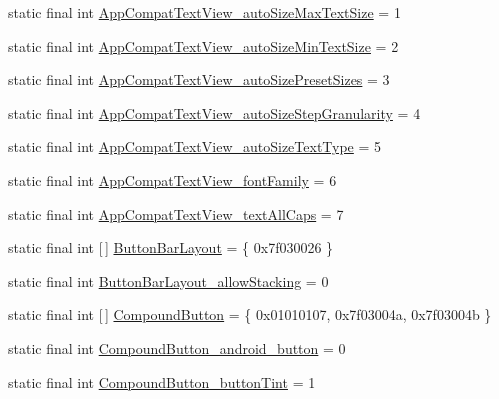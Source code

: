 \begin{DoxyCompactItemize}
\item 
static final int \mbox{\hyperlink{classcom_1_1google_1_1android_1_1gms_1_1R_1_1styleable_a18e47593a99285e77ee036e209ad4318}{App\+Compat\+Text\+View\+\_\+auto\+Size\+Max\+Text\+Size}} = 1
\item 
static final int \mbox{\hyperlink{classcom_1_1google_1_1android_1_1gms_1_1R_1_1styleable_aa47506d4b30e933210d368d9360a3c96}{App\+Compat\+Text\+View\+\_\+auto\+Size\+Min\+Text\+Size}} = 2
\item 
static final int \mbox{\hyperlink{classcom_1_1google_1_1android_1_1gms_1_1R_1_1styleable_afaff39e25514d872c2eeac7c6d953091}{App\+Compat\+Text\+View\+\_\+auto\+Size\+Preset\+Sizes}} = 3
\item 
static final int \mbox{\hyperlink{classcom_1_1google_1_1android_1_1gms_1_1R_1_1styleable_a12f3f949e246ab71c0cc78364946bb54}{App\+Compat\+Text\+View\+\_\+auto\+Size\+Step\+Granularity}} = 4
\item 
static final int \mbox{\hyperlink{classcom_1_1google_1_1android_1_1gms_1_1R_1_1styleable_a61dc26b3a032c9c806e5f683984e7955}{App\+Compat\+Text\+View\+\_\+auto\+Size\+Text\+Type}} = 5
\item 
static final int \mbox{\hyperlink{classcom_1_1google_1_1android_1_1gms_1_1R_1_1styleable_a06b56352a2e7071ed543c96904698b7c}{App\+Compat\+Text\+View\+\_\+font\+Family}} = 6
\item 
static final int \mbox{\hyperlink{classcom_1_1google_1_1android_1_1gms_1_1R_1_1styleable_a037708566032169b1bcab1412a66b4d2}{App\+Compat\+Text\+View\+\_\+text\+All\+Caps}} = 7
\item 
static final int \mbox{[}$\,$\mbox{]} \mbox{\hyperlink{classcom_1_1google_1_1android_1_1gms_1_1R_1_1styleable_a650b866397430655c4e09a4770bd71eb}{Button\+Bar\+Layout}} = \{ 0x7f030026 \}
\item 
static final int \mbox{\hyperlink{classcom_1_1google_1_1android_1_1gms_1_1R_1_1styleable_ad3442de6d8d64995e66c8e56f245d498}{Button\+Bar\+Layout\+\_\+allow\+Stacking}} = 0
\item 
static final int \mbox{[}$\,$\mbox{]} \mbox{\hyperlink{classcom_1_1google_1_1android_1_1gms_1_1R_1_1styleable_a384aa68f632e0b445b573d4fd74f849f}{Compound\+Button}} = \{ 0x01010107, 0x7f03004a, 0x7f03004b \}
\item 
static final int \mbox{\hyperlink{classcom_1_1google_1_1android_1_1gms_1_1R_1_1styleable_ac7709e57c59c14d4b0b12fe7dc3701f3}{Compound\+Button\+\_\+android\+\_\+button}} = 0
\item 
static final int \mbox{\hyperlink{classcom_1_1google_1_1android_1_1gms_1_1R_1_1styleable_a4194c572a8fffd850927852a918af186}{Compound\+Button\+\_\+button\+Tint}} = 1

\end{DoxyCompactItemize}
